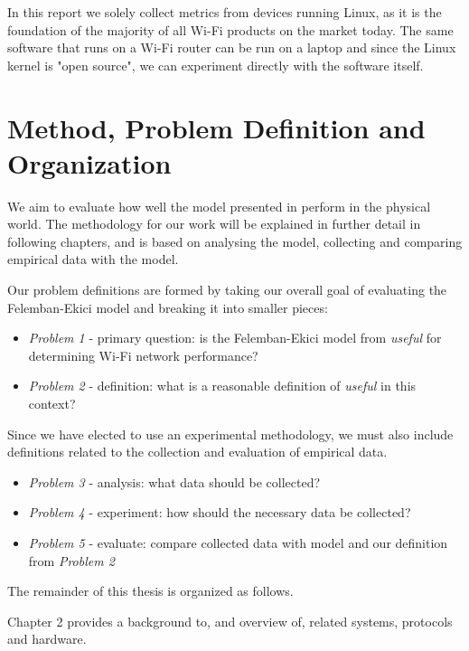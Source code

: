 In this report we solely collect metrics from devices running Linux, as it is
the foundation of the majority of all Wi-Fi products on the market today. The
same software that runs on a Wi-Fi router can be run on a laptop and since
the Linux kernel is "open source", we can experiment directly with the
software itself. 

\section{Method, Problem Definition and Organization}

We aim to evaluate how well the model presented in \cite{felemban} perform in the physical world. The methodology for our work will be explained in further
detail in following chapters, and is based on analysing the model, collecting and
comparing empirical data with the model. 

Our problem definitions are formed by taking our overall goal of evaluating the Felemban-Ekici model and breaking it into smaller pieces:

\begin{itemize}

\item \emph{Problem 1} - primary question: is the Felemban-Ekici model from
\cite{felemban} \emph{useful} for determining Wi-Fi network performance?

\item \emph{Problem 2} - definition: what is a reasonable definition of
\emph{useful} in this context?

\end{itemize}

Since we have elected to use an experimental methodology, we must also include definitions related to the collection and evaluation of empirical data.

\begin{itemize}
\item \emph{Problem 3} - analysis: what data should be collected?
\item \emph{Problem 4} - experiment: how should the necessary data be collected?
\item \emph{Problem 5} - evaluate: compare collected data with model and our definition from \emph{Problem 2}
\end{itemize}

The remainder of this thesis is organized as follows. 

Chapter 2 provides a background to, and overview of, related systems, protocols
and hardware. 

